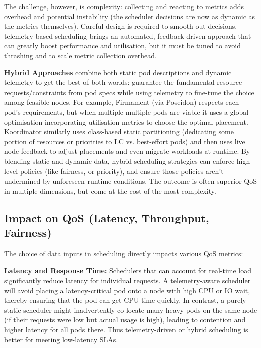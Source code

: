 The challenge, however, is complexity: collecting and reacting to metrics adds
overhead and potential instability (the scheduler decisions are now as dynamic
as the metrics themselves). Careful design is required to smooth out decisions.
telemetry-based scheduling brings an automated, feedback-driven approach that
can greatly boost performance and utilisation, but it must be tuned to avoid
thrashing and to scale metric collection overhead.

\textbf{Hybrid Approaches} combine both static pod descriptions and dynamic
telemetry to get the best of both worlds: guarantee the fundamental resource
requests/constraints from pod specs while using telemetry to fine-tune the
choice among feasible nodes. For example, Firmament (via Poseidon) \cite{}
respects each pod's requirements, but when multiple multiple pods are viable it
uses a global optimisation incorporating utilisation metrics to choose the
optimal placement. Koordinator \cite{} similarly uses class-based static
partitioning (dedicating some portion of resources or priorities to LC vs.
best-effort pods) and then uses live node feedback to adjust placements and even
migrate workloads at runtime. By blending static and dynamic data, hybrid
scheduling strategies can enforce high-level policies (like fairness, or
priority), and ensure those policies aren't undermined by unforeseen runtime
conditions. The outcome is often superior QoS in multiple dimensions, but come
at the cost of the most complexity.

\subsection{Impact on QoS (Latency, Throughput, Fairness)}
The choice of data inputs in scheduling directly impacts various QoS metrics:

\textbf{Latency and Response Time:} Schedulers that can account for real-time
load significantly reduce latency for individual requests. A telemetry-aware
scheduler will avoid placing a latency-critical pod onto a node with high CPU or
IO wait, thereby ensuring that the pod can get CPU time quickly. In contrast, a
purely static scheduler might inadvertently co-locate many heavy pods on the same
node (if their requests were low but actual usage is high), leading to
contention and higher latency for all pods there. Thus telemetry-driven or
hybrid scheduling is better for meeting low-latency SLAs.

